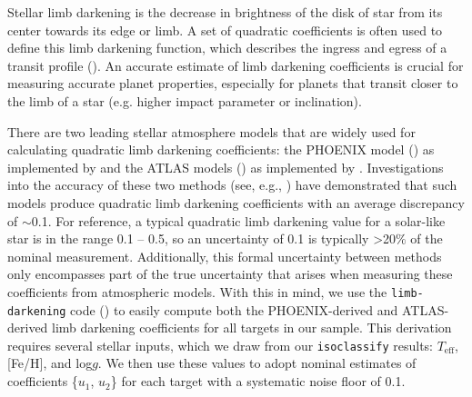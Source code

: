 \documentclass[twocolumn]{aastex63}
\begin{document}
Stellar limb darkening is the decrease in brightness of the disk of star from its center towards its edge or limb. A set of quadratic coefficients is often used to define this limb darkening function, which describes the ingress and egress of a transit profile (\citealt{Mandel02}). An accurate estimate of limb darkening coefficients is crucial for measuring accurate planet properties, especially for planets that transit closer to the limb of a star (e.g. higher impact parameter or inclination).

There are two leading stellar atmosphere models that are widely used for calculating quadratic limb darkening coefficients: the PHOENIX model (\citealt{HauschildtBaron99}) as implemented by \cite{Husser13} and the ATLAS models (\citealt{CastelliKurucz03}) as implemented by \cite{ClaretBloemen11}. Investigations into the accuracy of these two methods (see, e.g., \citealt{PatelEspinoza22}) have demonstrated that such models produce quadratic limb darkening coefficients with an average discrepancy of $\sim$0.1. For reference, a typical quadratic limb darkening value for a solar-like star is in the range 0.1 -- 0.5, so an uncertainty of 0.1 is typically >20$\%$ of the nominal measurement. Additionally, this formal uncertainty between methods only encompasses part of the true uncertainty that arises when measuring these coefficients from atmospheric models. With this in mind, we use the \texttt{limb-darkening} code (\citealt{EspinozaJordan15}) to easily compute both the PHOENIX-derived and ATLAS-derived limb darkening coefficients for all targets in our sample. This derivation requires several stellar inputs, which we draw from our \texttt{isoclassify} results: $T_\textrm{eff}$, [Fe/H], and log$g$. We then use these values to adopt nominal estimates of coefficients \{$u_1$, $u_2$\} for each target with a systematic noise floor of 0.1.
\end{document}
